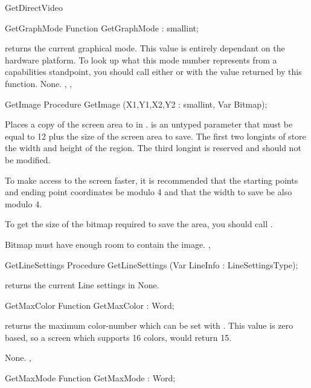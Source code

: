 \begin{function}{GetDirectVideo}
\begin{function}{GetGraphMode}
\Declaration
Function GetGraphMode  : smallint;

\Description
{} returns the current graphical mode. This value is
entirely dependant on the hardware platform. To look up what this
mode number represents from a capabilities standpoint, you should
call either  or  with the
value returned by this function.
\Errors
None.
\SeeAlso
{}, , 
\end{function}

\begin{procedure}{GetImage}
\Declaration
Procedure GetImage (X1,Y1,X2,Y2 : smallint, Var Bitmap);

\Description
{}
Places a copy of the screen area  to  in .
 is an untyped parameter that must be equal to 12 plus the size
of the screen area to save. The first two longints of  store
the width and height of the region. The third longint is reserved and should
not be modified.

To make access to the screen faster, it is recommended that the starting
points and ending point coordinates be modulo 4 and that the width to
save be also modulo 4.

To get the size of the bitmap required to save the area, you should call
.

\Errors
Bitmap must have enough room to contain the image.
\SeeAlso
{},
\end{procedure}

\begin{procedure}{GetLineSettings}
\Declaration
Procedure GetLineSettings (Var LineInfo : LineSettingsType);

\Description
{} returns the current Line settings in
\Errors
None.
\SeeAlso
{}
\end{procedure}
\begin{function}{GetMaxColor}
\Declaration
Function GetMaxColor  : Word;

\Description
{} returns the maximum color-number which can
be set with . This value is zero based, so a screen
which supports 16 colors, would return 15.

\Errors
None.
\SeeAlso
{},
\end{function}
\begin{function}{GetMaxMode}
\Declaration
Function GetMaxMode  : Word;


\end{function}
\end{function}
